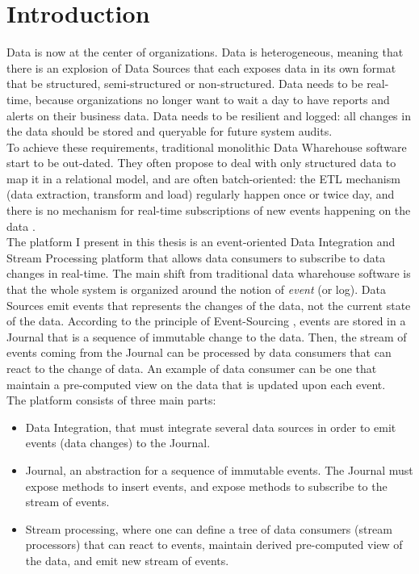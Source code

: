 \chapter{Introduction}

Data is now at the center of organizations. 
Data is heterogeneous, meaning that there is an explosion of Data Sources that each exposes data in its own format 
that be structured, semi-structured or non-structured.
Data needs to be real-time, because organizations no longer want to wait a day to have reports and alerts on their business data.
Data needs to be resilient and logged: all changes in the data should be stored and queryable for future system audits.
\\

To achieve these requirements, traditional monolithic Data Wharehouse software start to be out-dated. They often
propose to deal with only structured data to map it in a relational model, and are often batch-oriented: 
the ETL mechanism (data extraction, transform and load) regularly happen once or twice day, and there is no mechanism 
for real-time subscriptions of new events happening on the data \cite{bib:linkedinLog}.
\\

The platform I present in this thesis is an event-oriented Data Integration and Stream Processing platform that allows data consumers
to subscribe to data changes in real-time. The main shift from traditional data wharehouse software is that the whole
system is organized around the notion of \textit{event} (or log). Data Sources emit events that represents the changes 
of the data, not the current state of the data. According to the principle of Event-Sourcing \cite{bib:eventSourcing}, events
are stored in a Journal that is a sequence of immutable change to the data. Then, the stream of events coming from the Journal 
can be processed by data consumers that can react to the change of data. An example of data consumer can be one that maintain
a pre-computed view on the data that is updated upon each event.
\\

The platform consists of three main parts: 

\begin{itemize}
  \item Data Integration, that must integrate several data sources in order to emit 
events (data changes) to the Journal. 
  \item Journal, an abstraction for a sequence of immutable events. The Journal must expose methods to insert events,
  and expose methods to subscribe to the stream of events.
  \item Stream processing, where one can define a tree of data consumers (stream processors) that can react to
  events, maintain derived pre-computed view of the data, and emit new stream of events.
\end{itemize}

